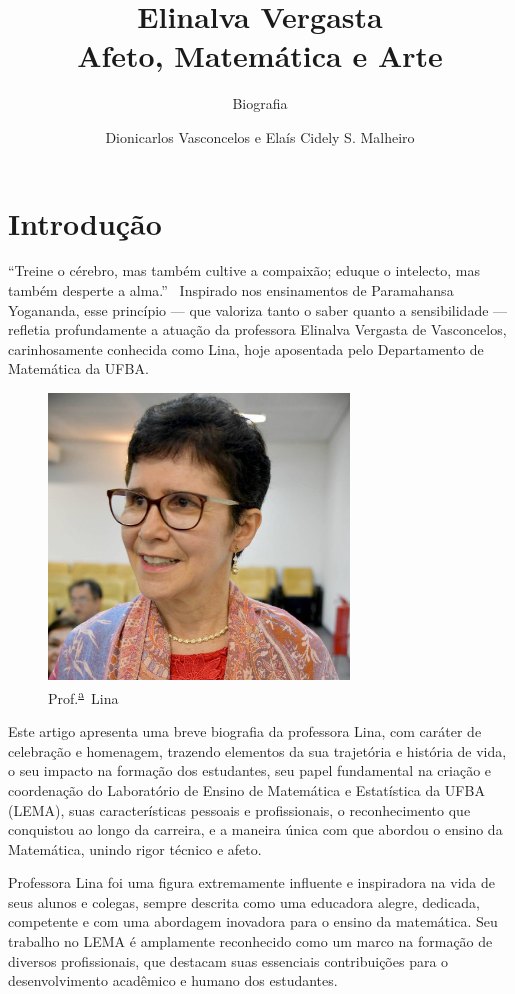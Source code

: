 \documentclass{hipatia}
\title{ \fontsize{28}{28}\selectfont Elinalva Vergasta\\  \fontsize{28}{28}\selectfont Afeto, Matemática e Arte}
\subtitle{Biografia}
\author{Dionicarlos Vasconcelos e Elaís Cidely S. Malheiro}
\newcommand{\superau}{\textsuperscript{\underline{a}}~}
\begin{document}
\setcounter{page}{\biografiapage}
\maketitle

\section{Introdução}
``Treine o cérebro, mas também cultive a compaixão; eduque o intelecto, mas também desperte a
alma.'' \ Inspirado nos ensinamentos de Paramahansa Yogananda, esse princípio --- que valoriza tanto o saber quanto a sensibilidade --- refletia profundamente a atuação da professora Elinalva
Vergasta de Vasconcelos, carinhosamente conhecida como Lina, hoje aposentada pelo Departamento de Matemática da UFBA.

\begin{figure}[htb!]
\includegraphics[width=8cm]{Lina.jpg}
\caption{Prof.\superau Lina}   
\end{figure}

Este artigo apresenta uma breve biografia da 
professora Lina, com caráter de celebração e homenagem,
trazendo elementos da sua trajetória e história de vida,
o seu impacto na formação dos estudantes, seu papel 
fundamental na criação e coordenação do 
Laboratório de Ensino de Matemática e Estatística 
da UFBA (LEMA), suas características 
pessoais e profissionais, o reconhecimento que 
conquistou ao longo da carreira, e a maneira 
única com que abordou o ensino da Matemática, 
unindo rigor técnico e afeto.  

Professora Lina foi uma figura extremamente influente e inspiradora na vida de seus alunos e colegas, sempre descrita como uma educadora alegre, dedicada, competente e com uma abordagem inovadora para o ensino da matemática. Seu trabalho no LEMA é amplamente reconhecido como um marco na formação de diversos profissionais, que destacam suas essenciais contribuições para o desenvolvimento acadêmico e humano dos estudantes.  
\end{document}
